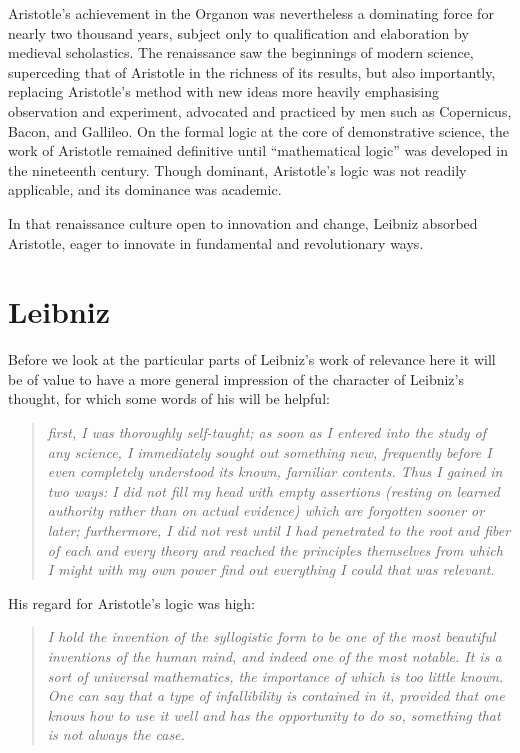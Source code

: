Aristotle's achievement in the Organon was nevertheless a dominating force for nearly two thousand years, subject only to qualification and elaboration by medieval scholastics.
The renaissance saw the beginnings of modern science, superceding that of Aristotle in the richness of its results, but also importantly, replacing Aristotle's method with new ideas more heavily emphasising observation and experiment, advocated and practiced by men such as Copernicus, Bacon, and Gallileo.
On the formal logic at the core of demonstrative science, the work of Aristotle remained definitive until ``mathematical logic'' was developed in the nineteenth century.
Though dominant, Aristotle's logic was not readily applicable, and its dominance was academic.

In that renaissance culture open to innovation and change, Leibniz absorbed Aristotle, eager to innovate in fundamental and revolutionary ways.

\section{Leibniz}

Before we look at the particular parts of Leibniz's work of relevance here it will be of value to have a more general impression of the character of Leibniz's thought,
for which some words of his will be helpful:

\begin{quotation}
{\it first, I was thoroughly self-taught; as soon as I entered into the study of any science,
I immediately sought out something new, frequently before I even completely understood its known, farniliar contents.
Thus I gained in two ways: I did not fill my head with empty assertions (resting on learned authority rather than on actual evidence) which are forgotten sooner or later; furthermore, I did not rest until I had penetrated to the root and fiber of each and every theory and reached the principles themselves from which I might with my own power find out everything I could that was relevant.}
\end{quotation}

His regard for Aristotle's logic was high:
\begin{quotation}
{\it I hold the invention of the syllogistic form to be one of the most beautiful
inventions of the human mind, and indeed one of the most notable. It is a
sort of universal mathematics, the importance of which is too little
known. One can say that a type of infallibility is contained in it, provided
that one knows how to use it well and has the opportunity to do so,
something that is not always the case.}
\end{quotation}

